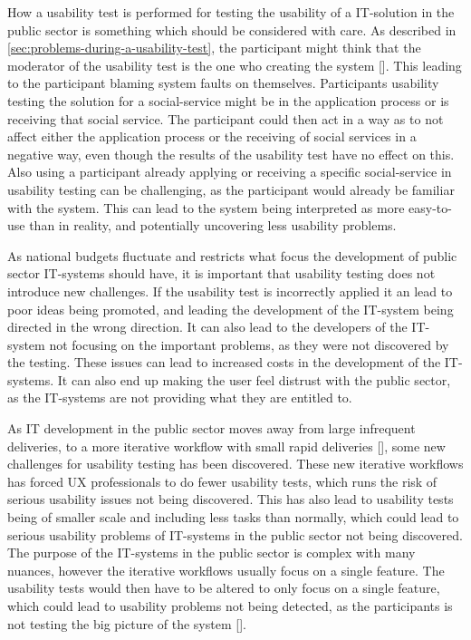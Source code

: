 How a usability test is performed for testing the usability of a IT-solution in the public sector is something which should be considered with care. As described in \autoref{sec:problems-during-a-usability-test}, the participant might think that the moderator of the usability test is the one who creating the system [\cite{dn_2016}]. This leading to the participant blaming system faults on themselves. Participants usability testing the solution for a social-service might be in the application process or is receiving that social service. The participant could then act in a way as to not affect either the application process or the receiving of social services in a negative way, even though the results of the usability test have no effect on this. Also using a participant already applying or receiving a specific social-service in usability testing can be challenging, as the participant would already be familiar with the system. This can lead to the system being interpreted as more easy-to-use than in reality, and potentially uncovering less usability problems.

As national budgets fluctuate and restricts what focus the development of public sector IT-systems should have, it is important that usability testing does not introduce new challenges. If the usability test is incorrectly applied it an lead to poor ideas being promoted, and leading the development of the IT-system being directed in the wrong direction. It can also lead to the developers of the IT-system not focusing on the important problems, as they were not discovered by the testing. These issues can lead to increased costs in the development of the IT-systems. It can also end up making the user feel distrust with the public sector, as the IT-systems are not providing what they are entitled to.  

As IT development in the public sector moves away from large infrequent deliveries, to a more iterative workflow with small rapid deliveries [\cite{at_2021}], some new challenges for usability testing has been discovered. These new iterative workflows has forced UX professionals to do fewer usability tests, which runs the risk of serious usability issues not being discovered. This has also lead to usability tests being of smaller scale and including less tasks than normally, which could lead to serious usability problems of IT-systems in the public sector not being discovered. The purpose of the IT-systems in the public sector is complex with many nuances, however the iterative workflows usually focus on a single feature. The usability tests would then have to be altered to only focus on a single feature, which could lead to usability problems not being detected, as the participants is not testing the big picture of the system [\cite{ln_2012}].

